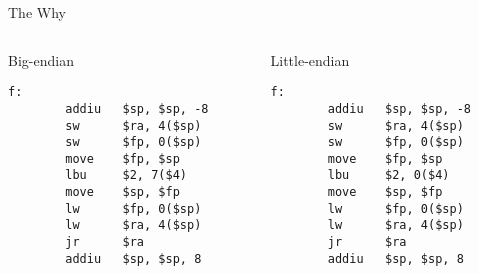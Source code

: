 \documentclass[hyphens,aspectratio=169,dvipsnames]{beamer}
\begin{document}
\begin{frame}[fragile]{The Why}
    \begin{center}
        \begin{columns}
            \begin{column}{0.5\textwidth}
                Big-endian
                \begin{verbatim}
f:
        addiu   $sp, $sp, -8
        sw      $ra, 4($sp)
        sw      $fp, 0($sp)
        move    $fp, $sp
        lbu     $2, 7($4)
        move    $sp, $fp
        lw      $fp, 0($sp)
        lw      $ra, 4($sp)
        jr      $ra
        addiu   $sp, $sp, 8
                \end{verbatim}
            \end{column}
            \begin{column}{0.5\textwidth}
                Little-endian
                \begin{verbatim}
f:
        addiu   $sp, $sp, -8
        sw      $ra, 4($sp)
        sw      $fp, 0($sp)
        move    $fp, $sp
        lbu     $2, 0($4)
        move    $sp, $fp
        lw      $fp, 0($sp)
        lw      $ra, 4($sp)
        jr      $ra
        addiu   $sp, $sp, 8
                \end{verbatim}
            \end{column}
        \end{columns}
    \end{center}
\end{frame}
\end{document}
